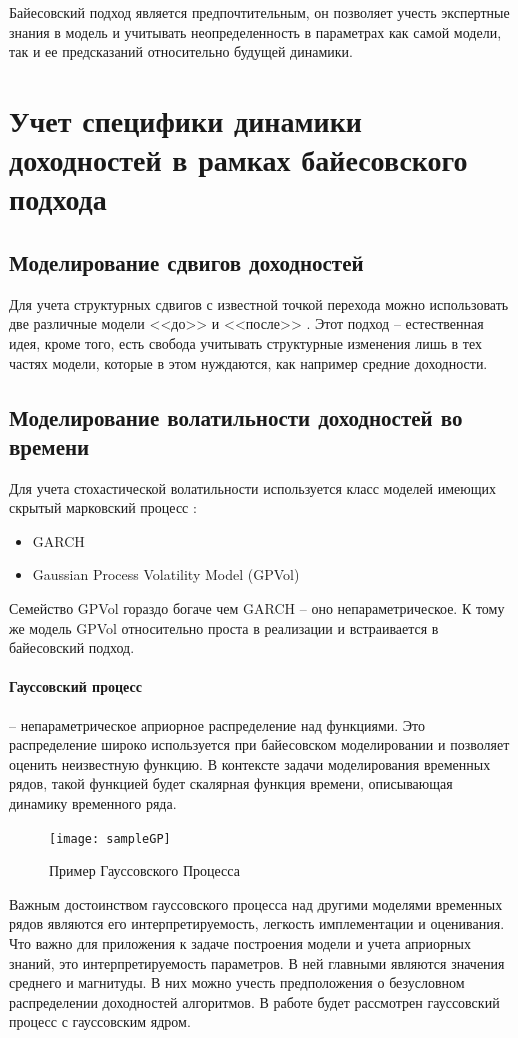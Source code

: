 Байесовский подход является предпочтительным, он позволяет учесть экспертные знания в модель и учитывать неопределенность в параметрах как самой модели, так и ее предсказаний относительно будущей динамики.
\section{Учет специфики динамики доходностей в рамках байесовского подхода}
\subsection{Моделирование сдвигов доходностей}
Для учета структурных сдвигов с известной точкой перехода можно использовать две различные модели <<до>> и <<после>> \citep{salazar1982}. Этот подход -- естественная идея, кроме того, есть свобода учитывать структурные изменения лишь в тех частях модели, которые в этом нуждаются, как например средние доходности.

\subsection{Моделирование волатильности доходностей во времени}
Для учета стохастической волатильности используется класс моделей имеющих скрытый марковский процесс \citep{ghahramani2001}:
\begin{itemize}
	\item GARCH \citep{engle1982}
	\item Gaussian Process Volatility Model (GPVol) \citep{han2016}
\end{itemize}
Семейство GPVol гораздо богаче чем GARCH -- оно непараметрическое. К тому же модель GPVol относительно проста в реализации и встраивается в байесовский подход.

\paragraph{Гауссовский процесс} -- непараметрическое априорное распределение над функциями. Это распределение широко используется при байесовском моделировании и позволяет оценить неизвестную функцию. В контексте задачи моделирования временных рядов, такой функцией будет скалярная функция времени, описывающая динамику временного ряда.
\begin{figure}[h]
	\centering
	\texttt{[image: sampleGP]}
	\caption{Пример Гауссовского Процесса}
\end{figure}
Важным достоинством гауссовского процесса над другими моделями временных рядов являются его интерпретируемость, легкость имплементации и оценивания. Что важно для приложения к задаче построения модели и учета априорных знаний, это интерпретируемость параметров. В ней главными являются значения среднего и магнитуды. В них можно учесть предположения о безусловном распределении доходностей алгоритмов. В работе будет рассмотрен гауссовский процесс с гауссовским ядром.

